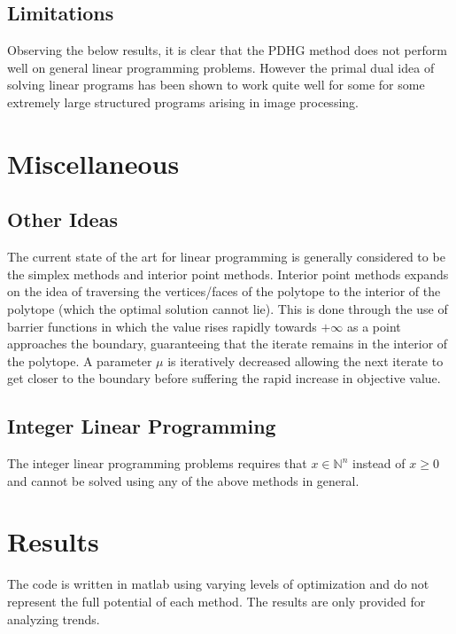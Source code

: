 \documentclass[letterpaper,twocolumn,12pt]{article}
\begin{document}
\subsection{Limitations}
Observing the below results, it is clear that the PDHG method does not perform
well on general linear programming problems.
However the primal dual idea of solving linear programs has been shown to work
quite well for some for some extremely large structured programs arising in image
processing. \cite{Chambolle2011}

\section{Miscellaneous}
\subsection{Other Ideas}
The current state of the art for linear programming is generally considered to be
the simplex methods and interior point methods. Interior point methods expands on
the idea of traversing the vertices/faces
of the polytope to the interior of the polytope (which the optimal solution cannot
lie). This is done through the use of barrier functions in which the value rises
rapidly towards $+\infty$ as a point approaches the boundary, guaranteeing that the
iterate remains in the interior of the polytope. A parameter $\mu$ is
iteratively decreased allowing the next iterate to get closer to the boundary before
suffering the rapid increase in objective value.

\subsection{Integer Linear Programming}
The integer linear programming problems requires that $x\in\mathbb{N}^n$ instead of
$x\geq 0$ and cannot be solved using any of the above methods in general.

\section{Results}
The code is written in matlab using varying levels of optimization and do not
represent the full potential of each method. The results are only provided for
analyzing trends.
\end{document}
